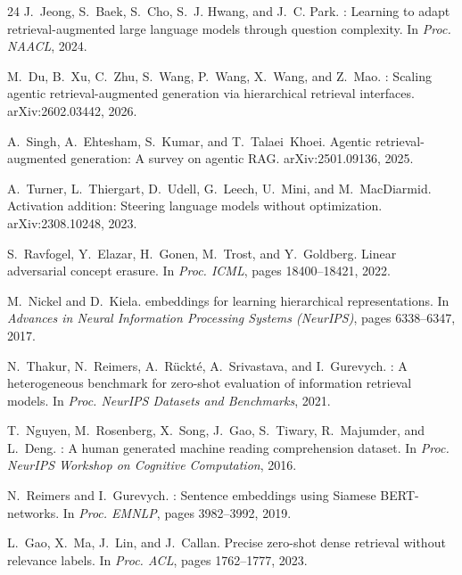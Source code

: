 \documentclass{article}
\begin{document}
\begin{thebibliography}{24}
J.~Jeong, S.~Baek, S.~Cho, S.~J. Hwang, and J.~C. Park.
: Learning to adapt retrieval-augmented large language models through question complexity.
\newblock In \emph{Proc. NAACL}, 2024.

M.~Du, B.~Xu, C.~Zhu, S.~Wang, P.~Wang, X.~Wang, and Z.~Mao.
: Scaling agentic retrieval-augmented generation via hierarchical retrieval interfaces.
\newblock arXiv:2602.03442, 2026.

A.~Singh, A.~Ehtesham, S.~Kumar, and T.~Talaei~Khoei.
\newblock Agentic retrieval-augmented generation: A survey on agentic {RAG}.
\newblock arXiv:2501.09136, 2025.

A.~Turner, L.~Thiergart, D.~Udell, G.~Leech, U.~Mini, and M.~MacDiarmid.
\newblock Activation addition: Steering language models without optimization.
\newblock arXiv:2308.10248, 2023.

S.~Ravfogel, Y.~Elazar, H.~Gonen, M.~Trost, and Y.~Goldberg.
\newblock Linear adversarial concept erasure.
\newblock In \emph{Proc. ICML}, pages 18400--18421, 2022.

M.~Nickel and D.~Kiela.
 embeddings for learning hierarchical representations.
\newblock In \emph{Advances in Neural Information Processing Systems (NeurIPS)}, pages 6338--6347, 2017.

N.~Thakur, N.~Reimers, A.~R\"{u}ckt\'{e}, A.~Srivastava, and I.~Gurevych.
: A heterogeneous benchmark for zero-shot evaluation of information retrieval models.
\newblock In \emph{Proc. NeurIPS Datasets and Benchmarks}, 2021.

T.~Nguyen, M.~Rosenberg, X.~Song, J.~Gao, S.~Tiwary, R.~Majumder, and L.~Deng.
: A human generated machine reading comprehension dataset.
\newblock In \emph{Proc. NeurIPS Workshop on Cognitive Computation}, 2016.

N.~Reimers and I.~Gurevych.
: Sentence embeddings using {S}iamese {BERT}-networks.
\newblock In \emph{Proc. EMNLP}, pages 3982--3992, 2019.

L.~Gao, X.~Ma, J.~Lin, and J.~Callan.
\newblock Precise zero-shot dense retrieval without relevance labels.
\newblock In \emph{Proc. ACL}, pages 1762--1777, 2023.


\end{thebibliography}
\end{document}
